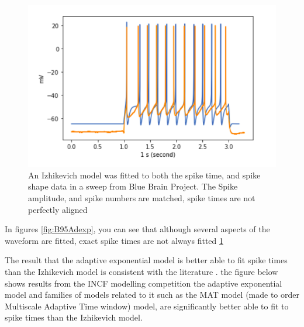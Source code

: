 \begin{figure}
    \centering
    \includegraphics{figures/IZHI_B95.png}
    \caption{An Izhikevich model was fitted to both the spike time, and spike shape data in a sweep from Blue Brain Project. The Spike amplitude, and spike numbers are matched, spike times are not perfectly aligned}
    \label{fig:B95_IZHI}
\end{figure}

In figures \ref{fig:B95Adexp}, you can see that although several aspects of the waveform are fitted, exact spike times are not always fitted \ref{fig:B95_IZHI}

The result that the adaptive exponential model is better able to fit spike times than the Izhikevich model is consistent with the literature \cite{rossant2011fitting}. the figure below shows results from the INCF modelling competition the adaptive exponential model and families of models related to it such as the MAT model (made to order Multiscale Adaptive Time window) model, are significantly better able to fit to spike times than the Izhikevich model.



